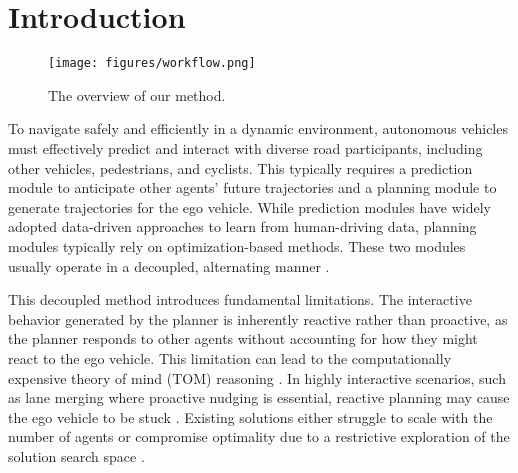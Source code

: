 \section{Introduction}


\begin{figure*}[!t]
    \centering
\texttt{[image: figures/workflow.png]}
    \caption{The overview of our method.}
    \label{fig:method workflow}
\end{figure*}

To navigate safely and efficiently in a dynamic environment, autonomous vehicles must effectively predict and interact with diverse road participants, including other vehicles, pedestrians, and cyclists.
This typically requires a prediction module to anticipate other agents' future trajectories and a planning module to generate trajectories for the ego vehicle.
While prediction modules have widely adopted data-driven approaches to learn from human-driving data, planning modules typically rely on optimization-based methods.
These two modules usually operate in a decoupled, alternating manner \citep{li2021prediction,chen2023interactive}.

This decoupled method introduces fundamental limitations.
The interactive behavior generated by the planner is inherently reactive rather than proactive, as the planner responds to other agents without accounting for how they might react to the ego vehicle.
This limitation can lead to the computationally expensive theory of mind (TOM) reasoning \citep{thomaz2016computational,devin2016implemented,gupta2023interaction,gupta2024towards}.
In highly interactive scenarios, such as lane merging where proactive nudging is essential, reactive planning may cause the ego vehicle to be stuck \cite{bae2020cooperation, unstuck}.
Existing solutions either struggle to scale with the number of agents \cite{isele2019interactive} or compromise optimality due to a restrictive exploration of the solution search space \cite{song2024efficient}.

